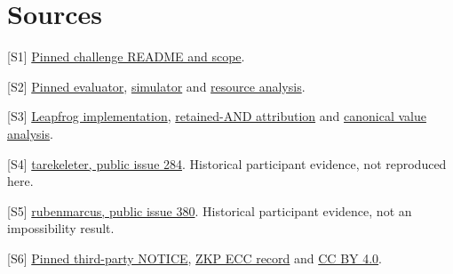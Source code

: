 \documentclass[11pt,letterpaper]{article}
\begin{document}
\section{Sources}

[S1] \href{https://github.com/Layr-Labs/ecdsafail-challenge/blob/2120d8a20c9d277e3cfdae29639ec58a78e72e16/README.md}{Pinned challenge README and scope}.


[S2] \href{https://github.com/Layr-Labs/ecdsafail-challenge/blob/2120d8a20c9d277e3cfdae29639ec58a78e72e16/src/bin/eval_circuit.rs}{Pinned evaluator}, \href{https://github.com/Layr-Labs/ecdsafail-challenge/blob/2120d8a20c9d277e3cfdae29639ec58a78e72e16/src/sim.rs}{simulator} and \href{https://github.com/Layr-Labs/ecdsafail-challenge/blob/2120d8a20c9d277e3cfdae29639ec58a78e72e16/src/circuit.rs}{resource analysis}.


[S3] \href{https://github.com/Layr-Labs/ecdsafail-challenge/blob/2120d8a20c9d277e3cfdae29639ec58a78e72e16/src/point_add/leapfrog.rs}{Leapfrog implementation}, \href{https://github.com/Layr-Labs/ecdsafail-challenge/blob/2120d8a20c9d277e3cfdae29639ec58a78e72e16/src/point_add/retained_and.rs}{retained-AND attribution} and \href{https://github.com/Layr-Labs/ecdsafail-challenge/blob/2120d8a20c9d277e3cfdae29639ec58a78e72e16/src/point_add/pscan.rs}{canonical value analysis}.


[S4] \href{https://github.com/Layr-Labs/ecdsafail-challenge/issues/284}{tarekeleter, public issue 284}. Historical participant evidence, not reproduced here.


[S5] \href{https://github.com/Layr-Labs/ecdsafail-challenge/issues/380}{rubenmarcus, public issue 380}. Historical participant evidence, not an impossibility result.


[S6] \href{https://github.com/Layr-Labs/ecdsafail-challenge/blob/2120d8a20c9d277e3cfdae29639ec58a78e72e16/NOTICE}{Pinned third-party NOTICE}, \href{https://doi.org/10.5281/zenodo.19196956}{ZKP ECC record} and \href{https://creativecommons.org/licenses/by/4.0/}{CC BY 4.0}.
\end{document}
